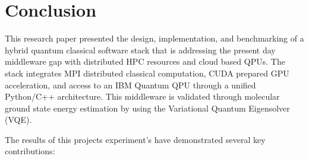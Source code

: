 \section{Conclusion}
This research paper presented the design, implementation, and benchmarking of a hybrid quantum classical software 
stack that is addressing the present day middleware gap with distributed HPC resources and cloud based QPUs. 
The stack integrates MPI distributed classical computation, CUDA prepared GPU acceleration, and access to an IBM 
Quantum QPU through a unified Python/C++ architecture. This middleware is validated through molecular ground state 
energy estimation by using the Variational Quantum Eigensolver (VQE).

The results of this projects experiment's have demonstrated several key contributions:

